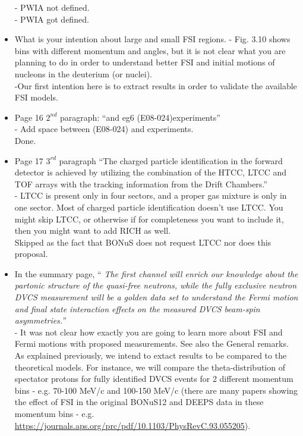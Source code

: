 \begin{itemize}
- PWIA not defined.\\
     {\color{red} - PWIA got defined. }

  
\item What is your intention about large and small FSI regions. 
  - Fig. 3.10 shows bins with different momentum and angles, but it is not 
    clear what you are planning to do in order to understand better FSI and 
    initial motions of nucleons in the deuterium (or nuclei).\\
     {\color{red} -Our first intention here is to extract results in order to 
     validate the available FSI models. }
  
  \item Page 16 $2^{nd}$ paragraph: ``and eg6 (E08-024)experiments'' \\
  - Add space between (E08-024) and experiments.\\
     {\color{red} Done.}
  
 \item Page 17 $3^{rd}$ paragraph ``The charged particle identification in the 
    forward detector is achieved by utilizing the combination of the HTCC, LTCC 
    and TOF arrays with the tracking information from the Drift Chambers.'' \\
- LTCC is present only in four sectors, and a proper gas mixture is only in one 
  sector. Most of charged particle identification doesn't use LTCC. You might 
  skip LTCC, or otherwise if for completeness you want to include it, then you 
  might want to add RICH as well.\\
     {\color{red} Skipped as the fact that BONuS does not request LTCC nor does 
     this proposal.}


\item In the summary page, ``\textit{ The first channel will enrich our 
   knowledge about the partonic structure of the quasi-free neutrons, while the 
   fully exclusive neutron DVCS measurement will be a golden data set to 
   understand the Fermi motion and final state interaction effects on the 
   measured DVCS beam-spin asymmetries.''}\\
- It was not clear how exactly you are going to learn more about FSI and Fermi 
  motions with proposed measurements. See also the General remarks.\\

     {\color{red} As explained previously, we intend to extact results to be 
     compared to the theoretical models. For instance, we will compare the 
     theta-distribution of spectator protons for fully identified DVCS events 
     for 2 different momentum bins - e.g. 70-100 MeV/c and 100-150 MeV/c (there 
     are many papers showing the effect of FSI in the original BONuS12 and 
     DEEPS data in these momentum bins - e.g.  
     \url{https://journals.aps.org/prc/pdf/10.1103/PhysRevC.93.055205}).}

\end{itemize}
 


